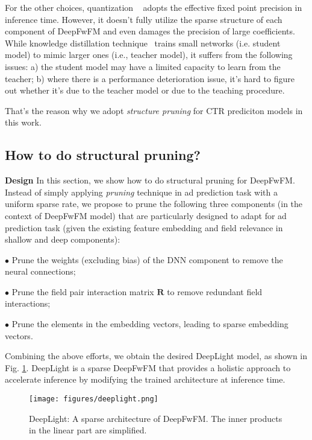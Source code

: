 \documentclass[sigconf]{acmart}
\begin{document}
For the other choices, quantization ~\cite{hansong16} adopts the effective fixed point precision in inference time. However, it doesn't fully utilize the sparse structure of each component of DeepFwFM and even damages the precision of large coefficients. While knowledge distillation technique~\cite{distill} trains small networks (i.e. student model) to mimic larger ones (i.e., teacher model), it suffers from the following issues: a) the student model may have a limited capacity to learn from the teacher; 
b) where there is a performance deterioration issue, it's hard to figure out whether it's due to the teacher model or due to the teaching procedure.

That's the reason why we adopt \emph{structure pruning} for CTR prediciton models in this work.



\subsection{How to do structural pruning?}

{\bf Design} In this section, we show how to do structural pruning for DeepFwFM. Instead of simply applying \emph{pruning} technique in ad prediction task with a uniform sparse rate,  we propose to prune the following three components (in the context of DeepFwFM model) that are particularly designed to adapt for ad prediction task (given the existing feature embedding and field relevance in shallow and deep components): 

$\bullet$ Prune the weights (excluding bias) of the DNN component to remove the neural connections;

$\bullet$ Prune the field pair interaction matrix $\bm{R}$ to remove redundant field interactions;

$\bullet$ Prune the elements in the embedding vectors, leading to sparse embedding vectors.


Combining the above efforts, we obtain the desired DeepLight model, as shown in Fig. \ref{sparse_deepFwFM}. DeepLight is a sparse DeepFwFM that provides a holistic approach to accelerate inference by  modifying the trained architecture at inference time. 


\begin{figure}[h!]
\centering
  \texttt{[image: figures/deeplight.png]}
  \caption{DeepLight: A sparse architecture of DeepFwFM. The inner products in the linear part are simplified.}
  \label{sparse_deepFwFM}
\end{figure}
\end{document}
